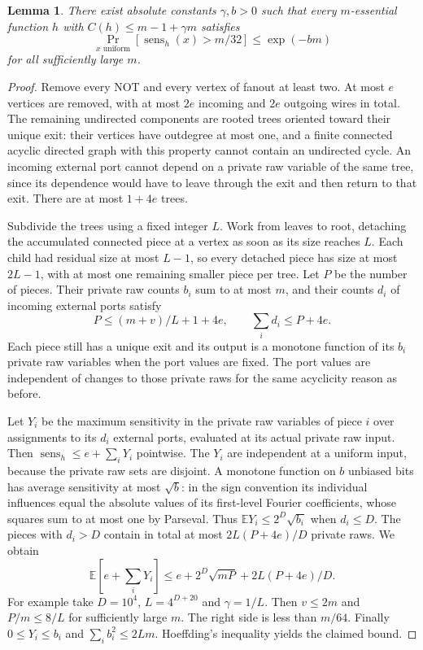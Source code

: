 \documentclass[11pt]{article}
\newtheorem{lemma}[theorem]{Lemma}
\newcommand{\sen}{\operatorname{sens}}
\begin{document}
\begin{lemma}\label{lem:tail}
There exist absolute constants $\gamma,b>0$ such that every $m$-essential function $h$ with $C(h)\le m-1+\gamma m$ satisfies
\[
  \Pr_{x\text{ uniform}}[\sen_h(x)>m/32]\le \exp(-b m)
\]
for all sufficiently large $m$.
\end{lemma}
\begin{proof}
Remove every NOT and every vertex of fanout at least two. At most $e$ vertices are removed, with at most $2e$ incoming and $2e$ outgoing wires in total. The remaining undirected components are rooted trees oriented toward their unique exit: their vertices have outdegree at most one, and a finite connected acyclic directed graph with this property cannot contain an undirected cycle. An incoming external port cannot depend on a private raw variable of the same tree, since its dependence would have to leave through the exit and then return to that exit. There are at most $1+4e$ trees.

Subdivide the trees using a fixed integer $L$. Work from leaves to root, detaching the accumulated connected piece at a vertex as soon as its size reaches $L$. Each child had residual size at most $L-1$, so every detached piece has size at most $2L-1$, with at most one remaining smaller piece per tree. Let $P$ be the number of pieces. Their private raw counts $b_i$ sum to at most $m$, and their counts $d_i$ of incoming external ports satisfy
\[
     P\le(m+v)/L+1+4e,\qquad \sum_i d_i\le P+4e.
\]
Each piece still has a unique exit and its output is a monotone function of its $b_i$ private raw variables when the port values are fixed. The port values are independent of changes to those private raws for the same acyclicity reason as before.

Let $Y_i$ be the maximum sensitivity in the private raw variables of piece $i$ over assignments to its $d_i$ external ports, evaluated at its actual private raw input. Then $\sen_h\le e+\sum_iY_i$ pointwise. The $Y_i$ are independent at a uniform input, because the private raw sets are disjoint. A monotone function on $b$ unbiased bits has average sensitivity at most $\sqrt b$: in the sign convention its individual influences equal the absolute values of its first-level Fourier coefficients, whose squares sum to at most one by Parseval. Thus $\mathbb E Y_i\le 2^D\sqrt{b_i}$ when $d_i\le D$. The pieces with $d_i>D$ contain in total at most $2L(P+4e)/D$ private raws. We obtain
\[
  \mathbb E[e+\textstyle\sum_iY_i]\le e+2^D\sqrt{mP}+ 2L(P+4e)/D.
\]
For example take $D=10^4$, $L=4^{D+20}$ and $\gamma=1/L$. Then $v\le2m$ and $P/m\le 8/L$ for sufficiently large $m$. The right side is less than $m/64$. Finally $0\le Y_i\le b_i$ and $\sum_i b_i^2\le2Lm$. Hoeffding's inequality yields the claimed bound.
\end{proof}
\end{document}
